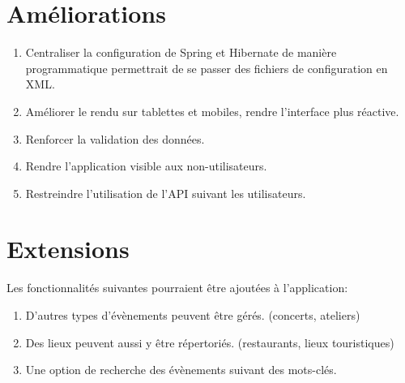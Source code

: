 \documentclass[11pt,a4paper,margin=0.5in]{report}
\begin{document}
\section{Améliorations}
\begin{enumerate}
    \item Centraliser la configuration de Spring et Hibernate de manière programmatique permettrait de se passer des fichiers de configuration en XML.
    \item Améliorer le rendu sur tablettes et mobiles, rendre l'interface plus réactive.
    \item Renforcer la validation des données.
    \item Rendre l'application visible aux non-utilisateurs.
    \item Restreindre l'utilisation de l'API suivant les utilisateurs.
\end{enumerate}

\section{Extensions}
Les fonctionnalités suivantes pourraient être ajoutées à l'application:
\begin{enumerate}
    \item D'autres types d'évènements peuvent être gérés. (concerts, ateliers)
    \item Des lieux peuvent aussi y être répertoriés. (restaurants, lieux touristiques)
    \item Une option de recherche des évènements suivant des mots-clés.
\end{enumerate}
\end{document}

